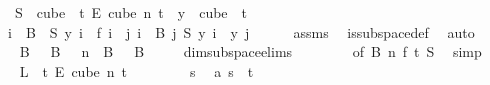 \begin{isabellebody}
\ \ {\isasymand}\ S\ {\isasymin}\ {\isacharparenleft}{\kern0pt}cube\ {}\ t{\isacharparenright}{\kern0pt}\ {\isasymrightarrow}\isactrlsub E\ {\isacharparenleft}{\kern0pt}cube\ n\ t{\isacharparenright}{\kern0pt}\ {\isasymand}\ {\isacharparenleft}{\kern0pt}{\isasymforall}y\ {\isasymin}\ cube\ {}\ t{\isachardot}{\kern0pt}\isanewline
\ \ {\isacharparenleft}{\kern0pt}{\isasymforall}i\ {\isasymin}\ B\ {}{\isachardot}{\kern0pt}\ S\ y\ i\ {\isacharequal}{\kern0pt}\ f\ i{\isacharparenright}{\kern0pt}\ {\isasymand}\ {\isacharparenleft}{\kern0pt}{\isasymforall}j{\isacharless}{\kern0pt}{}{\isachardot}{\kern0pt}\ {\isasymforall}i\ {\isasymin}\ B\ j{\isachardot}{\kern0pt}\ {\isacharparenleft}{\kern0pt}S\ y{\isacharparenright}{\kern0pt}\ i\ {\isacharequal}{\kern0pt}\ y\ j{\isacharparenright}{\kern0pt}{\isacharparenright}{\kern0pt}{\isachardoublequoteclose}\isanewline
\ \ \ \ \isamarkupfalse%
\ assms{\isacharparenleft}{\kern0pt}{}{\isacharparenright}{\kern0pt}\ \isamarkupfalse%
\ is{\isacharunderscore}{\kern0pt}subspace{\isacharunderscore}{\kern0pt}def\ \isamarkupfalse%
\ auto\isanewline
\ \ \isamarkupfalse%
\ \isamarkupfalse%
\ {}{\isacharcolon}{\kern0pt}\ {\isachardoublequoteopen}B\ {}\ {\isasymunion}\ B\ {}\ {\isacharequal}{\kern0pt}\ {\isacharbraceleft}{\kern0pt}{\isachardot}{\kern0pt}{\isachardot}{\kern0pt}{\isacharless}{\kern0pt}n{\isacharbraceright}{\kern0pt}\ {\isasymand}\ B\ {}\ {\isasyminter}\ B\ {}\ {\isacharequal}{\kern0pt}\ {\isacharbraceleft}{\kern0pt}{\isacharbraceright}{\kern0pt}{\isachardoublequoteclose}\ \isamarkupfalse%
\ dim{}{\isacharunderscore}{\kern0pt}subspace{\isacharunderscore}{\kern0pt}elims{\isacharparenleft}{\kern0pt}{}{\isacharcomma}{\kern0pt}\isanewline
\ \ \ \ \ \ \ \ {}{\isacharparenright}{\kern0pt}{\isacharbrackleft}{\kern0pt}of\ B\ n\ f\ t\ S{\isacharbrackright}{\kern0pt}\ \isamarkupfalse%
\ simp\isanewline
\isanewline
\ \ \isamarkupfalse%
\ {\isachardoublequoteopen}L\ {\isasymin}\ {\isacharbraceleft}{\kern0pt}{\isachardot}{\kern0pt}{\isachardot}{\kern0pt}{\isacharless}{\kern0pt}t{\isacharbraceright}{\kern0pt}\ {\isasymrightarrow}\isactrlsub E\ cube\ n\ t{\isachardoublequoteclose}\isanewline
\ \ \isamarkupfalse%
\isanewline
\ \ \ \ \isamarkupfalse%
\ s\ \isamarkupfalse%
\ a{\isacharcolon}{\kern0pt}\ {\isachardoublequoteopen}s\ {\isasymin}\ {\isacharbraceleft}{\kern0pt}{\isachardot}{\kern0pt}{\isachardot}{\kern0pt}{\isacharless}{\kern0pt}t{\isacharbraceright}{\kern0pt}{\isachardoublequoteclose}\isanewline

\end{isabellebody}

